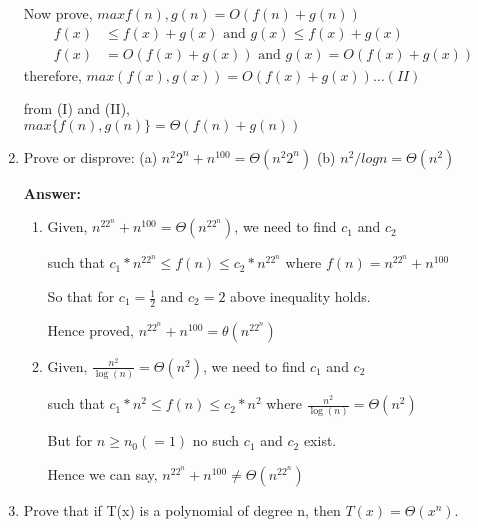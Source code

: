 \documentclass[a4paper]{article}
\begin{document}
\begin{enumerate}[label=(\alph*)]
     \vspace{0.5cm}
     \*Now prove, {$ max{f(n), g(n)} = O(f(n) + g(n)) $}
     \begin{align*}
         f(x) &\le f(x) + g(x)  \text{ and }  g(x) \le f(x) + g(x) \\
         f(x) &= O(f(x) + g(x))  \text{ and }  g(x) = O(f(x) + g(x)) 
     \end{align*}
     therefore, {$ max(f(x), g(x)) = O(f(x) + g(x)) \dots (II) $}
     
     \vspace{0.5cm}
     \*from (I) and (II),
     \\{$ max\{f(n), g(n)\} = \Theta(f(n) + g(n)) $}
     
     \vspace{0.5cm}
     \item Prove or disprove: (a) {$n^2 2^n + n^{100} = \Theta(n^2 2^n)$} (b) {$ n^2/log n = \Theta(n^2) $}
     
     \textbf{Answer:}
     
     \begin{enumerate}
         \item  Given, {$ n^22^n + n^{100} = \Theta(n^22^n) $}, we need to find {$        c_1 $} and {$ c_2 $} 
                    
                 such that {$ c_1 * n^22^n \le f(n) \le c_2 * n^22^n $}
                 where {$ f(n) = n^22^n + n^{100} $}

                 So that for {$ c_1 = \frac{1}{2}$} and {$c_2 = 2 $} above inequality holds.

                 Hence proved, {$ n^22^n + n^{100} = \theta(n^22^n) $}
        
         \vspace{0.5cm}
         \item  Given, {$ \frac{n^2}{\log(n)} = \Theta(n^2)$}, we need to find {$        c_1 $} and {$ c_2 $} 
                    
                such that {$ c_1 * n^2 \le f(n) \le c_2 * n^2 $}
                where {$ \frac{n^2}{\log(n)} = \Theta(n^2)$}

                But for {$ n \ge n_0(=1) $} no such {$ c_1 $} and {$ c_2 $} exist.

                Hence we can say, {$ n^22^n + n^{100} \ne \Theta(n^22^n) $}
     \end{enumerate}
     
     \vspace{0.5cm}
     \item  Prove that if T(x) is a polynomial of degree n, then {$T(x) = \Theta(x^n)$}.
     

\end{enumerate}
\end{document}
